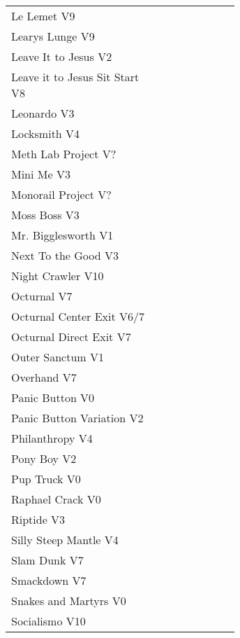 \begin{multicols*}{2}
\begin{center}
\begin{supertabular}{p{0.65\linewidth}r}
Le Lemet V9 & \pageref{rt:Le Lemet} \\
Learys Lunge V9 & \pageref{rt:Learys Lunge} \\
Leave It to Jesus V2 & \pageref{rt:Leave It to Jesus} \\
Leave it to Jesus Sit Start V8 & \pageref{vr:Leave it to Jesus Sit Start} \\
Leonardo V3 & \pageref{rt:Leonardo} \\
Locksmith V4 & \pageref{rt:Locksmith} \\
Meth Lab Project V? & \pageref{rt:Meth Lab Project} \\
Mini Me V3 & \pageref{rt:Mini Me} \\
Monorail Project V? & \pageref{rt:Monorail Project} \\
Moss Boss V3 & \pageref{rt:Moss Boss} \\
Mr. Bigglesworth V1 & \pageref{vr:Mr. Bigglesworth} \\
Next To the Good V3 & \pageref{rt:Next To the Good} \\
Night Crawler V10 & \pageref{rt:Night Crawler} \\
Octurnal V7 & \pageref{rt:Octurnal} \\
Octurnal Center Exit V6/7 & \pageref{vr:Octurnal Center Exit} \\
Octurnal Direct Exit V7 & \pageref{vr:Octurnal Direct Exit} \\
Outer Sanctum V1 & \pageref{rt:Outer Sanctum} \\
Overhand V7 & \pageref{rt:Overhand} \\
Panic Button V0 & \pageref{rt:Panic Button} \\
Panic Button Variation V2 & \pageref{vr:Panic Button Variation} \\
Philanthropy V4 & \pageref{rt:Philanthropy} \\
Pony Boy V2 & \pageref{rt:Pony Boy} \\
Pup Truck V0 & \pageref{rt:Pup Truck} \\
Raphael Crack V0 & \pageref{rt:Raphael Crack} \\
Riptide V3 & \pageref{rt:Riptide} \\
Silly Steep Mantle V4 & \pageref{rt:Silly Steep Mantle} \\
Slam Dunk V7 & \pageref{rt:Slam Dunk} \\
Smackdown V7 & \pageref{rt:Smackdown} \\
Snakes and Martyrs V0 & \pageref{rt:Snakes and Martyrs} \\
Socialismo V10 & \pageref{rt:Socialismo} \\

\end{supertabular}
\end{center}
\end{multicols*}

